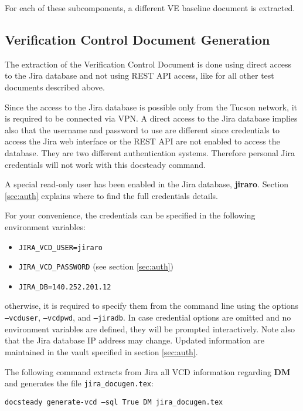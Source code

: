 \documentclass[DM]{lsstdoc}
\begin{document}
For each of these subcomponents, a different VE baseline document is extracted.



\subsection{Verification Control Document Generation}

The extraction of the Verification Control Document is done using direct access to the Jira database and not using REST API access, like for all other test documents described above.

Since the access to the Jira database is possible only from the Tucson network, it is required to be connected via VPN.
A direct access to the Jira database implies also that the username and password to use are different since credentials to access the Jira web interface or the REST API are not enabled to access the database. They are two different authentication systems.
Therefore personal Jira credentials will not work with this docsteady command.

A special read-only user has been enabled in the Jira database, \textbf{jiraro}.
Section \ref{sec:auth} explains where to find the full credentials details.

For your convenience, the credentials can be specified in the following environment variables:

\begin{itemize}
\item \texttt{JIRA\_VCD\_USER=jiraro}
\item \texttt{JIRA\_VCD\_PASSWORD} (see section \ref{sec:auth})
\item \texttt{JIRA\_DB=140.252.201.12}
\end{itemize}

otherwise, it is required to specify them from the command line using the options \texttt{--vcduser}, \texttt{--vcdpwd}, and \texttt{--jiradb}.
In case credential options are omitted and no environment variables are defined, they will be prompted interactively.
Note also that the Jira database IP address may change. Updated information are maintained in the vault specified in section \ref{sec:auth}.

The following command extracts from Jira all VCD information regarding \textbf{DM} and generates the file \texttt{jira\_docugen.tex}:

\texttt{docsteady generate-vcd --sql True DM jira\_docugen.tex}
\end{document}
